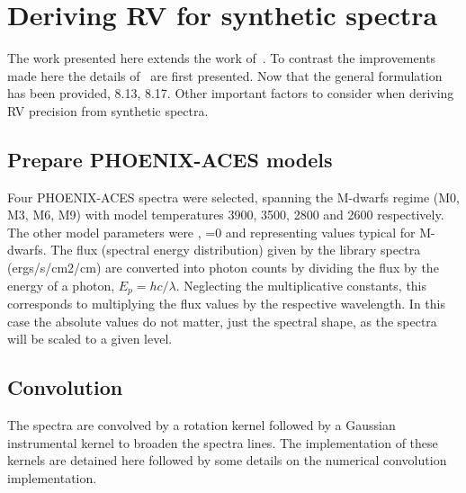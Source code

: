 
\section{Deriving RV for synthetic spectra}
The work presented here extends the work of~\citep{figueira_radial_2016}.
To contrast the improvements made here the details of~\citep{figueira_radial_2016} are first presented.
Now that the general formulation has been provided, 8.13, 8.17.
Other important factors to consider when deriving RV precision from synthetic spectra.

\subsection{Prepare {PHOENIX-ACES} models}
Four {PHOENIX-ACES} spectra were selected, spanning the M-dwarfs regime (M0, M3, M6, M9) with model temperatures 3900, 3500, 2800 and 2600\K{} respectively.
The other model parameters were , \feh{}=0 and  representing values typical for M-dwarfs.
The flux (spectral energy distribution) given by the library spectra (ergs/s/cm2/cm) are converted into photon counts by dividing the flux by the energy of a photon, \({E}_{p}=hc/\lambda\).
Neglecting the multiplicative constants, this corresponds to multiplying the flux values by the respective wavelength.
In this case the absolute values do not matter, just the spectral shape, as the spectra will be scaled to a given \snr{} level.

\subsection{Convolution}
\label{subsec:convolutions}
The spectra are convolved by a rotation kernel followed by a Gaussian instrumental kernel to broaden the spectra lines.
The implementation of these kernels are detained here followed by some details on the numerical convolution implementation.

